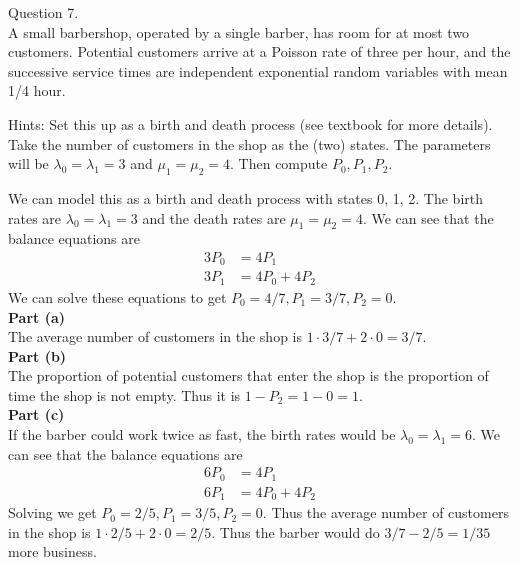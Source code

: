 \documentclass[answers,12pt,addpoints]{exam}
\begin{document}
\begin{questions}
\question Question 7.\\
    A small barbershop, operated by a single barber, has room for at most two customers. Potential customers arrive at a Poisson rate of three per hour, and the successive service times are
    independent exponential random variables with mean 1/4 hour.
    Hints: Set this up as a birth and death process (see textbook for more details). Take the number
    of customers in the shop as the (two) states. The parameters will be $\lambda_0 = \lambda_1 = 3$ and $\mu_1 = \mu_2 = 4$. Then compute $P_0, P_1, P_2$.
    \begin{solution}
        We can model this as a birth and death process with states 0, 1, 2. The birth rates are \(\lambda_0 = \lambda_1 = 3\) and the death rates are \(\mu_1 = \mu_2 = 4\). We can see that the balance equations are
        \begin{align*}
            3P_0 &= 4P_1\\
            3P_1 &= 4P_0 + 4P_2
        \end{align*}
        We can solve these equations to get \(P_0 = 4/7, P_1 = 3/7, P_2 = 0\).\\
        \textbf{Part (a)}\\
        The average number of customers in the shop is \(1 \cdot 3/7 + 2 \cdot 0 = 3/7\).\\
        \textbf{Part (b)}\\
        The proportion of potential customers that enter the shop is the proportion of time the shop is not empty. Thus it is \(1 - P_2 = 1 - 0 = 1\).\\
        \textbf{Part (c)}\\
        If the barber could work twice as fast, the birth rates would be \(\lambda_0 = \lambda_1 = 6\). We can see that the balance equations are
        \begin{align*}
            6P_0 &= 4P_1\\
            6P_1 &= 4P_0 + 4P_2
        \end{align*}
        Solving we get \(P_0 = 2/5, P_1 = 3/5, P_2 = 0\). Thus the average number of customers in the shop is \(1 \cdot 2/5 + 2 \cdot 0 = 2/5\). Thus the barber would do \(3/7 - 2/5 = 1/35\) more business.
    \end{solution}


\end{questions}
\end{document}
